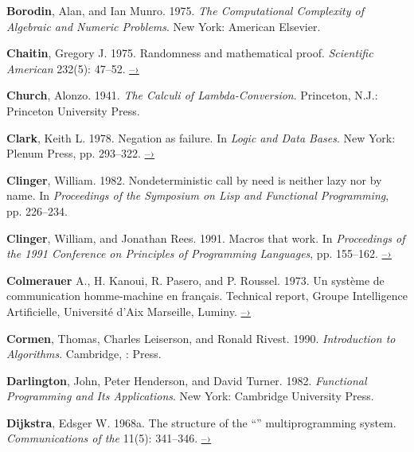  \label{Borodin and Munro (1975)}
\textbf{Borodin}, Alan, and Ian Munro.  1975.  \textit{The Computational Complexity of
Algebraic and Numeric Problems}. New York: American Elsevier.

 \label{Chaitin 1975}
\textbf{Chaitin}, Gregory J.  1975.  Randomness and mathematical proof.
\textit{Scientific American} 232(5): 47--52.
\href{https://www.cs.auckland.ac.nz/~chaitin/sciamer.html}{–›}

 \label{Church (1941)}
\textbf{Church}, Alonzo.  1941.  \textit{The Calculi of Lambda-Conversion}.  Princeton,
N.J.: Princeton University Press.

 \label{Clark (1978)}
\textbf{Clark}, Keith L.  1978.  Negation as failure.  In \textit{Logic and Data Bases}.
New York: Plenum Press, pp. 293--322.
\href{http://www.doc.ic.ac.uk/~klc/neg.html}{–›}

 \label{Clinger (1982)}
\textbf{Clinger}, William.  1982.  Nondeterministic call by need is neither lazy nor by
name. In \textit{Proceedings of the  Symposium on Lisp and
Functional Programming}, pp. 226--234.

 \label{Clinger and Rees 1991}
\textbf{Clinger}, William, and Jonathan Rees.  1991.  Macros that work.  In
\textit{Proceedings of the 1991  Conference on Principles of
Programming Languages}, pp. 155--162.
\href{http://mumble.net/~jar/pubs/macros_that_work.ps}{–›}

 \label{Colmerauer et al. 1973}
\textbf{Colmerauer} A., H. Kanoui, R. Pasero, and P. Roussel.  1973.  Un syst\`eme de
communication homme-machine en fran\c{c}ais.  Technical report, Groupe
Intelligence Artificielle, Universit\'e d'Aix Marseille, Luminy.
\href{http://alain.colmerauer.free.fr/alcol/ArchivesPublications/HommeMachineFr/HoMa.pdf}{–›}

 \label{Cormen et al. 1990}
\textbf{Cormen}, Thomas, Charles Leiserson, and Ronald Rivest.  1990. \textit{Introduction
to Algorithms}. Cambridge, :  Press.

 \label{Darlington et al. 1982}
\textbf{Darlington}, John, Peter Henderson, and David Turner.  1982.  \textit{Functional
Programming and Its Applications}. New York: Cambridge University Press.

 \label{Dijkstra 1968a}
\textbf{Dijkstra}, Edsger W. 1968a.  The structure of the “”
multiprogramming system.  \textit{Communications of the }
11(5): 341--346.
\href{http://www.cs.utexas.edu/users/EWD/ewd01xx/EWD196.PDF}{–›}

